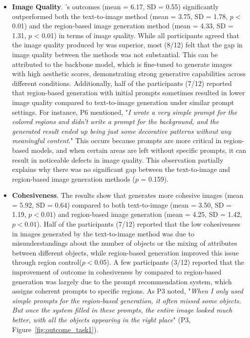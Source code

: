 \begin{itemize}
    \item \textbf{Image Quality}.
    \tool’s outcomes (mean = 6.17, SD = 0.55) significantly outperformed both the text-to-image method (mean = 3.75, SD = 1.78, $p$ < 0.01) and the region-based image generation method (mean = 4.33, SD = 1.31, $p$ < 0.01) in terms of image quality. 
    While all participants agreed that the image quality produced by \tool was superior, most (8/12) felt that the gap in image quality between the methods was not substantial. 
    This can be attributed to the backbone model, which is fine-tuned to generate images with high aesthetic scores, demonstrating strong generative capabilities across different conditions.
    Additionally, half of the participants (7/12) reported that region-based generation with initial prompts sometimes resulted in lower image quality compared to text-to-image generation under similar prompt settings. 
    For instance, P6 mentioned, "\emph{I wrote a very simple prompt for the colored regions and didn’t write a prompt for the background, and the generated result ended up being just some decorative patterns without any meaningful content}."
    This occurs because prompts are more critical in region-based models, and when certain areas are left without specific prompts, it can result in noticeable defects in image quality. 
    This observation partially explains why there was no significant gap between the text-to-image and region-based image generation methods ($p$ = 0.159).

    \item \textbf{Cohesiveness}.
    The results show that \tool generates more cohesive images (mean = 5.92, SD = 0.64) compared to both text-to-image (mean = 3.50, SD = 1.19, $p<0.01$) and region-based image generation (mean = 4.25, SD = 1.42, $p<0.01$).
    Half of the participants (7/12) reported that the low cohesiveness in images generated by the text-to-image method was due to misunderstandings about the number of objects or the mixing of attributes between different objects,
    while region-based generation improved this issue through region control($p<0.05$).
    A few participants (3/12) reported that the improvement of outcome in cohesiveness by \tool compared to region-based generation was largely due to the prompt recommendation system, which assigns coherent prompts to specific regions.
    As P3 noted, "\emph{When I only used simple prompts for the region-based generation, it often missed some objects. But once the system filled in these prompts, the entire image looked much better, with all the objects appearing in the right place}" (P3, Figure~\ref{fig:outcome_task1}).


\end{itemize}
